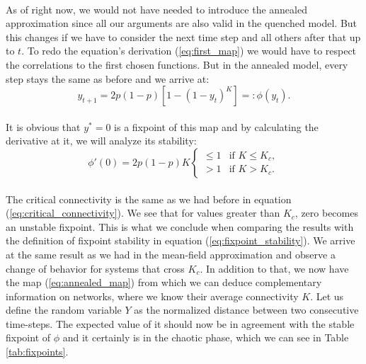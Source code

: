 \paragraph*{}
As of right now, we would not have needed to introduce the annealed approximation since all our arguments are also valid in the quenched model. But this changes if we have to consider the next time step and all others after that up to $t$. To redo the equation's derivation (\ref{eq:first_map}) we would have to respect the correlations to the first chosen functions. But in the annealed model, every step stays the same as before and we arrive at:
\begin{equation}\label{eq:annealed_map}
y_{t+1} = 2p(1-p)[1-(1-y_t)^K] =: \phi(y_t).
\end{equation}

\paragraph*{}
It is obvious that $y^* = 0$ is a fixpoint of this map and by calculating the derivative at it, we will analyze its stability:
\begin{equation}
\phi'(0) = 2p(1-p)K
\begin{cases}
\leq 1 & \text{if } K \leq K_c, \\
> 1 & \text{if } K > K_c.
\end{cases}
\end{equation}

\paragraph*{}
The critical connectivity is the same as we had before in equation (\ref{eq:critical_connectivity}). We see that for values greater than $K_c$, zero becomes an unstable fixpoint. This is what we conclude when comparing the results with the definition of fixpoint stability in equation (\ref{eq:fixpoint_stability}). We arrive at the same result as we had in the mean-field approximation and observe a change of behavior for systems that cross $K_c$. In addition to that, we now have the map (\ref{eq:annealed_map}) from which we can deduce complementary information on networks, where we know their average connectivity $K$. Let us define the random variable $Y$ as the normalized distance between two consecutive time-steps. The expected value of it should now be in agreement with the stable fixpoint of $\phi$ and it certainly is in the chaotic phase, which we can see in Table \ref{tab:fixpoints}.

